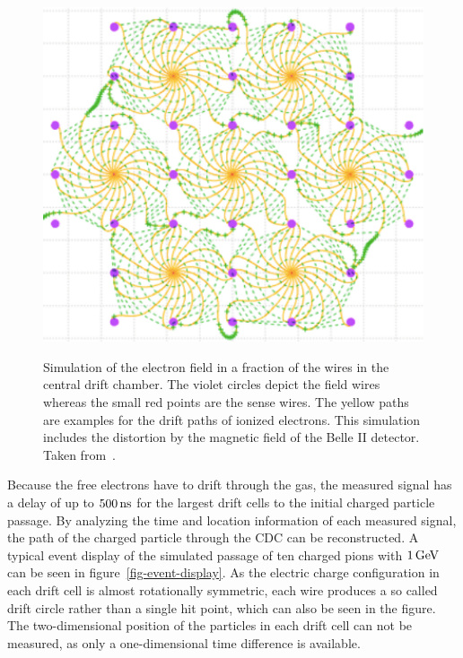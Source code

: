 \begin{figure}
  \caption[Simulation of the electric field in the central drift chamber.]{Simulation of the electron field in a fraction of the wires in the central drift chamber. The violet circles depict the field wires whereas the small red points are the sense wires. The yellow paths are examples for the drift paths of ionized electrons. This simulation includes the distortion by the magnetic field of the Belle II detector. Taken from~\cite{cdc_design}.}
  \includegraphics[width=0.5\linewidth]{figures/experimental_setup/electronsInCDC.pdf}
  \label{fig-sense-wires}
\end{figure}

Because the free electrons have to drift through the gas, the measured signal has a delay of up to $\unit[500]{ns}$ for the largest drift cells to the initial charged particle passage. By analyzing the time and location information of each measured signal, the path of the charged particle through the CDC can be reconstructed. A typical event display of the simulated passage of ten charged pions with $\unit[1]{GeV}$ can be seen in figure~\ref{fig-event-display}. As the electric charge configuration in each drift cell is almost rotationally symmetric, each wire produces a so called drift circle rather than a single hit point, which can also be seen in the figure. The two-dimensional position of the particles in each drift cell can not be measured, as only a one-dimensional time difference is available.

